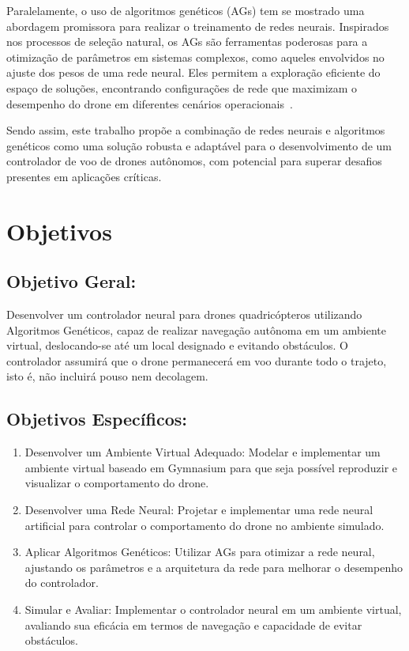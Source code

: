 \documentclass[12pt]{article}
\begin{document}
Paralelamente, o uso de algoritmos genéticos (AGs) tem se mostrado uma abordagem promissora para realizar o treinamento de redes neurais. Inspirados nos processos de seleção natural, os AGs são ferramentas poderosas para a otimização de parâmetros em sistemas complexos, como aqueles envolvidos no ajuste dos pesos de uma rede neural. Eles permitem a exploração eficiente do espaço de soluções, encontrando configurações de rede que maximizam o desempenho do drone em diferentes cenários operacionais~\cite{ReviewGeneticAlgorithm, GeneticAlgorithms}.

Sendo assim, este trabalho propõe a combinação de redes neurais e algoritmos genéticos como uma solução robusta e adaptável para o desenvolvimento de um controlador de voo de drones autônomos, com potencial para superar desafios presentes em aplicações críticas.

\section{Objetivos}
\subsection{Objetivo Geral:}
Desenvolver um controlador neural para drones quadricópteros utilizando Algoritmos Genéticos, capaz de realizar navegação autônoma em um ambiente virtual, deslocando-se até um local designado e evitando obstáculos. O controlador assumirá que o drone permanecerá em voo durante todo o trajeto, isto é, não incluirá pouso nem decolagem.

\subsection{Objetivos Específicos:}
\begin{enumerate}
\item Desenvolver um Ambiente Virtual Adequado: Modelar e implementar um ambiente virtual baseado em Gymnasium para que seja possível reproduzir e visualizar o comportamento do drone.
\item Desenvolver uma Rede Neural: Projetar e implementar uma rede neural artificial para controlar o comportamento do drone no ambiente simulado.
\item Aplicar Algoritmos Genéticos: Utilizar AGs para otimizar a rede neural, ajustando os parâmetros e a arquitetura da rede para melhorar o desempenho do controlador.
\item Simular e Avaliar: Implementar o controlador neural em um ambiente virtual, avaliando sua eficácia em termos de navegação e capacidade de evitar obstáculos.
\end{enumerate}
\end{document}
